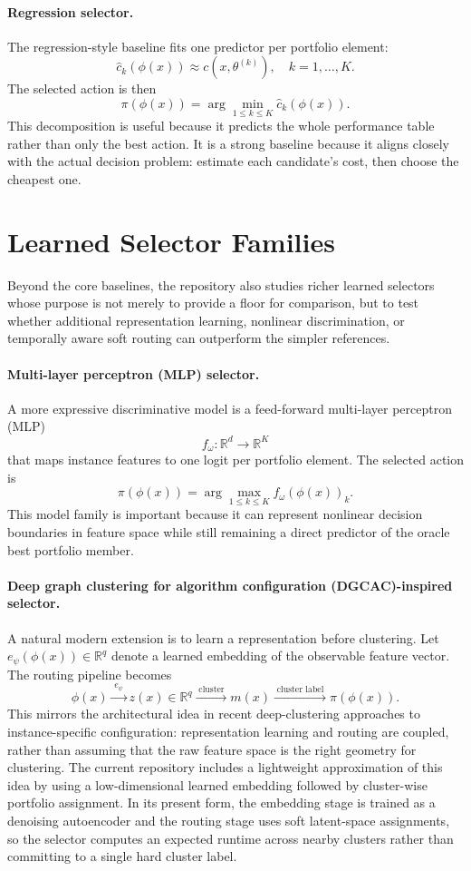 \documentclass[11pt]{report}
\begin{document}
\paragraph{Regression selector.}
The regression-style baseline fits one predictor per portfolio element:
\[
\hat{c}_k(\phi(x)) \approx c(x, \theta^{(k)}),
\quad k = 1, \dots, K.
\]
The selected action is then
\[
\pi(\phi(x)) = \arg\min_{1 \le k \le K} \hat{c}_k(\phi(x)).
\]
This decomposition is useful because it predicts the whole performance table rather than only the best action. It is a strong baseline because it aligns closely with the actual decision problem: estimate each candidate's cost, then choose the cheapest one.

\section{Learned Selector Families}

Beyond the core baselines, the repository also studies richer learned selectors whose purpose is not merely to provide a floor for comparison, but to test whether additional representation learning, nonlinear discrimination, or temporally aware soft routing can outperform the simpler references.

\paragraph{Multi-layer perceptron (MLP) selector.}
A more expressive discriminative model is a feed-forward multi-layer perceptron (MLP)
\[
f_\omega : \mathbb{R}^d \to \mathbb{R}^K
\]
that maps instance features to one logit per portfolio element. The selected action is
\[
\pi(\phi(x)) = \arg\max_{1 \le k \le K} f_\omega(\phi(x))_k.
\]
This model family is important because it can represent nonlinear decision boundaries in feature space while still remaining a direct predictor of the oracle best portfolio member.

\paragraph{Deep graph clustering for algorithm configuration (DGCAC)-inspired selector.}
A natural modern extension is to learn a representation before clustering. Let $e_\psi(\phi(x)) \in \mathbb{R}^q$ denote a learned embedding of the observable feature vector. The routing pipeline becomes
\[
\phi(x) \xrightarrow{\;e_\psi\;} z(x) \in \mathbb{R}^q
\xrightarrow{\;\text{cluster}\;} m(x)
\xrightarrow{\;\text{cluster label}\;} \pi(\phi(x)).
\]
This mirrors the architectural idea in recent deep-clustering approaches to instance-specific configuration: representation learning and routing are coupled, rather than assuming that the raw feature space is the right geometry for clustering. The current repository includes a lightweight approximation of this idea by using a low-dimensional learned embedding followed by cluster-wise portfolio assignment.
In its present form, the embedding stage is trained as a denoising autoencoder and the routing stage uses soft latent-space assignments, so the selector computes an expected runtime across nearby clusters rather than committing to a single hard cluster label.
\end{document}
